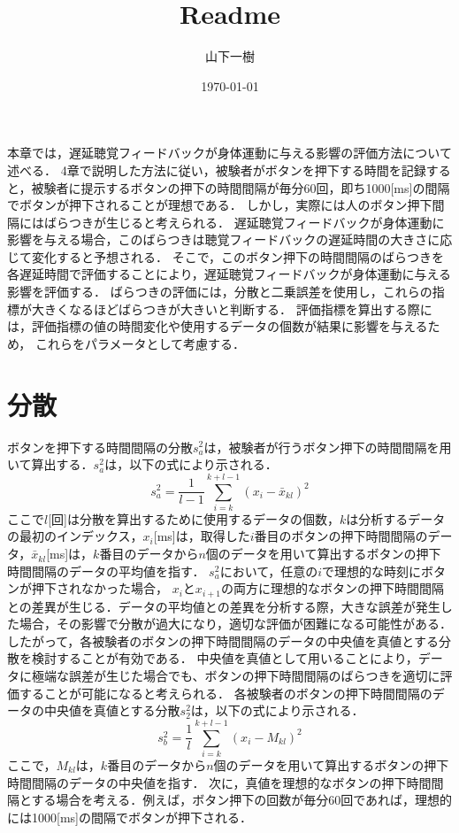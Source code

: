 \documentclass{article} %
\title{Readme} %
\author{山下一樹} %
\date{\today} %
\begin{document}
本章では，遅延聴覚フィードバックが身体運動に与える影響の評価方法について述べる．
4章で説明した方法に従い，被験者がボタンを押下する時間を記録すると，被験者に提示するボタンの押下の時間間隔が毎分60回，即ち1000[ms]の間隔でボタンが押下されることが理想である．
しかし，実際には人のボタン押下間隔にはばらつきが生じると考えられる．
遅延聴覚フィードバックが身体運動に影響を与える場合，このばらつきは聴覚フィードバックの遅延時間の大きさに応じて変化すると予想される．
そこで，このボタン押下の時間間隔のばらつきを各遅延時間で評価することにより，遅延聴覚フィードバックが身体運動に与える影響を評価する．
ばらつきの評価には，分散と二乗誤差を使用し，これらの指標が大きくなるほどばらつきが大きいと判断する．
評価指標を算出する際には，評価指標の値の時間変化や使用するデータの個数が結果に影響を与えるため，
これらをパラメータとして考慮する．
\section{分散}
ボタンを押下する時間間隔の分散$s^2_{a}$は，被験者が行うボタン押下の時間間隔を用いて算出する．$s^2_{a}$は，以下の式により示される．
\begin{equation}
  s^2_a = \frac{1}{l-1} \sum_{i=k}^{k+l-1} (x_i - \bar{x}_{kl})^2
\end{equation}
ここで$l$[回]は分散を算出するために使用するデータの個数，$k$は分析するデータの最初のインデックス，$x_{i}$[ms]は，取得した$i$番目のボタンの押下時間間隔のデータ，$\bar{x}_{kl}$[ms]は，$k$番目のデータから$n$個のデータを用いて算出するボタンの押下時間間隔のデータの平均値を指す．
$s^2_{a}$において，任意の$i$で理想的な時刻にボタンが押下されなかった場合，
$x_{i}$と$x_{i+1}$の両方に理想的なボタンの押下時間間隔との差異が生じる．データの平均値との差異を分析する際，大きな誤差が発生した場合，その影響で分散が過大になり，適切な評価が困難になる可能性がある．したがって，各被験者のボタンの押下時間間隔のデータの中央値を真値とする分散を検討することが有効である．
中央値を真値として用いることにより，データに極端な誤差が生じた場合でも、ボタンの押下時間間隔のばらつきを適切に評価することが可能になると考えられる．
各被験者のボタンの押下時間間隔のデータの中央値を真値とする分散$s^2_{2}$は，以下の式により示される．
\begin{equation}
  s^2_b = \frac{1}{l} \sum_{i=k}^{k+l-1} (x_i - M_{kl})^2
\end{equation}
ここで，$M_{kl}$は，$k$番目のデータから$n$個のデータを用いて算出するボタンの押下時間間隔のデータの中央値を指す．
次に，真値を理想的なボタンの押下時間間隔とする場合を考える．例えば，ボタン押下の回数が毎分60回であれば，理想的には1000[ms]の間隔でボタンが押下される．
\end{document}
